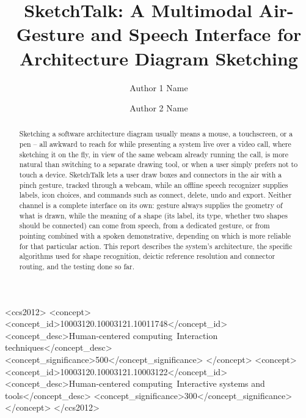 \documentclass[sigconf]{acmart}
\begin{document}
\title{SketchTalk: A Multimodal Air-Gesture and Speech Interface for Architecture Diagram Sketching}

\author{Author 1 Name}

\author{Author 2 Name}

\begin{abstract}
Sketching a software architecture diagram usually means a mouse, a
touchscreen, or a pen -- all awkward to reach for while presenting a system
live over a video call, where sketching it on the fly, in view of the same
webcam already running the call, is more natural than switching to a
separate drawing tool, or when a user simply prefers not to touch a
device. SketchTalk lets a user draw boxes and connectors in
the air with a pinch gesture, tracked through a webcam, while an offline
speech recognizer supplies labels, icon choices, and commands such as
connect, delete, undo and export. Neither channel is a complete interface
on its own: gesture always supplies the geometry of what is drawn, while
the meaning of a shape (its label, its type, whether two shapes should be
connected) can come from speech, from a dedicated gesture, or from pointing
combined with a spoken demonstrative, depending on which is more reliable
for that particular action. This report describes the system's
architecture, the specific algorithms used for shape recognition, deictic
reference resolution and connector routing, and the testing done so far.
\end{abstract}

\begin{CCSXML}
<ccs2012>
<concept>
<concept_id>10003120.10003121.10011748</concept_id>
<concept_desc>Human-centered computing~Interaction techniques</concept_desc>
<concept_significance>500</concept_significance>
</concept>
<concept>
<concept_id>10003120.10003121.10003122</concept_id>
<concept_desc>Human-centered computing~Interactive systems and tools</concept_desc>
<concept_significance>300</concept_significance>
</concept>
</ccs2012>
\end{CCSXML}


\end{document}
